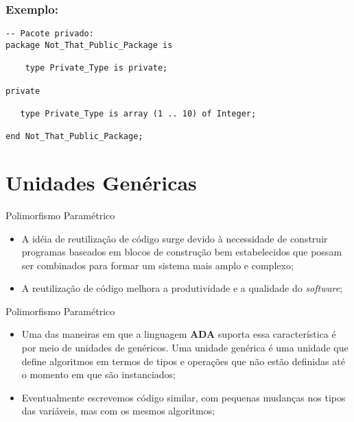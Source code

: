 \documentclass{beamer}
\begin{document}
    \begin{frame}[containsverbatim]

        \frametitle{Exemplo:}
        \begin{verbatim}
-- Pacote privado:
package Not_That_Public_Package is

    type Private_Type is private;

private

   type Private_Type is array (1 .. 10) of Integer;

end Not_That_Public_Package;
        \end{verbatim}
    \end{frame}

    \section{Unidades Genéricas}
    \begin{frame}{Polimorfismo Paramétrico}
        \begin{itemize}
            \item<1-> A idéia de reutilização de código surge devido à
            necessidade de construir programas baseados em blocos de construção
            bem estabelecidos que possam ser combinados para formar um sistema
            mais amplo e complexo;
            \item<2-> A reutilização de código melhora a produtividade e a
            qualidade do \textit{software};
        \end{itemize}
    \end{frame}

    \begin{frame}{Polimorfismo Paramétrico}
        \begin{itemize}
            \item<1-> Uma das maneiras em que a linguagem \textbf{ADA} suporta
            essa característica é por meio de unidades de genéricos. Uma unidade
            genérica é uma unidade que define algoritmos em termos de tipos e
            operações que não estão definidas até o momento em que são
            instanciados;
            \item<2-> Eventualmente escrevemos código similar, com pequenas
            mudanças nos tipos das variáveis, mas com os mesmos algoritmos;
        \end{itemize}
    \end{frame}
\end{document}
